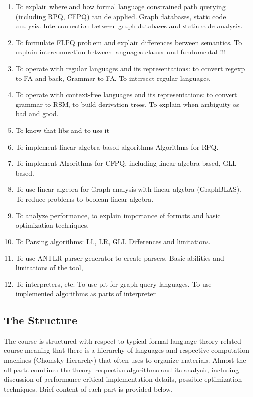 \documentclass[sigconf]{acmart}
\begin{document}
\begin{enumerate}
  \item To explain where and how formal language constrained path querying (including RPQ, CFPQ) can de applied. 
  Graph databases, static code analysis. 
  Interconnection between graph databases and static code analysis.
  \item To formulate FLPQ problem and explain differences between semantics. 
  To explain interconnection between languages classes and fundamental !!!
  \item To operate with regular languages and its representations: to convert regexp to  FA and back, Grammar to FA. 
  To intersect regular languages.
  \item To operate with context-free languages and its representations: to convert grammar to RSM, to build derivation trees. 
  To explain when ambiguity os bad and good.
  \item To know that libs and to use it
  \item To implement linear algebra based algorithms Algorithms for RPQ. 
  \item To implement Algorithms for CFPQ, including linear algebra based, GLL based.
  \item To use linear algebra for Graph analysis with linear algebra (GraphBLAS). 
  To reduce problems to boolean linear algebra. 
  \item To analyze performance, to explain importance of formats and basic optimization techniques.
  \item To Parsing algorithms: LL, LR, GLL Differences and limitations. 
  \item To use ANTLR parser generator to create parsers. Basic abilities and limitations of the tool, 
  \item To interpreters, etc. To use plt for graph query languages. To use implemented algorithms as parts of interpreter
\end{enumerate}

\subsection{The Structure}

The course is structured with respect to typical formal language theory related course meaning that there is a hierarchy of languages and respective computation machines (Chomsky hierarchy) that often uses to organize materials. 
Almost the all parts combines the theory, respective algorithms and its analysis, including discussion of performance-critical implementation details, possible optimization techniques. 
Brief content of each part is provided below.
\end{document}
